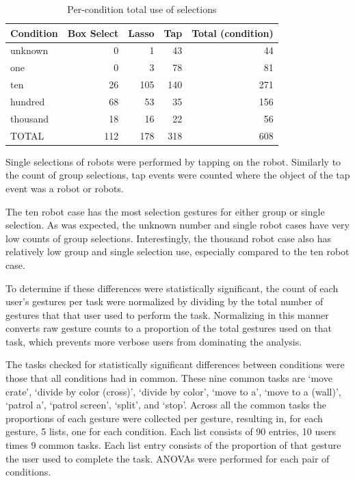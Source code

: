 \begin{table}
	\centering
	\begin{tabular}{l r r r r}
		Condition & Box Select & Lasso & Tap & Total (condition)\\
		\hline
		unknown & 0 & 1 & 43 & 44 \\
		one & 0 & 3 & 78 & 81\\
		ten & 26 & 105 & 140 & 271\\
		hundred & 68 & 53 & 35 & 156\\
		thousand & 18 & 16 & 22 & 56\\
		\hline
		TOTAL & 112 & 178 & 318 & 608\\
	\end{tabular}
	\caption{Per-condition total use of selections}
\end{table}

Single selections of robots were performed by tapping on the robot. 
Similarly to the count of group selections, tap events were counted where the object of the tap event was a robot or robots. 

The ten robot case has the most selection gestures for either group or single selection. 
As was expected, the unknown number and single robot cases have very low counts of group selections. 
Interestingly, the thousand robot case also has relatively low group and single 
selection use, especially compared to the ten robot case. 

To determine if these differences were statistically significant, the count of each user's gestures per task were normalized by dividing by the total number of gestures that that user used to perform the task. 
Normalizing in this manner converts raw gesture counts to a proportion of the total gestures used on that task, which prevents more verbose users from dominating the analysis.

The tasks checked for statistically significant differences between conditions were those that all conditions had in common. 
These nine common tasks are `move crate', `divide by color (cross)', `divide by color', `move to a', `move to a (wall)', `patrol a', `patrol screen', `split', and `stop'. 
Across all the common tasks the proportions of each gesture were collected per gesture, resulting in, for each gesture, 5 lists, one for each condition. Each list consists of 90 entries, 10 users times 9 common tasks. Each list entry consists of the proportion of that gesture the user used to complete the task. ANOVAs were performed for each pair of conditions. 

